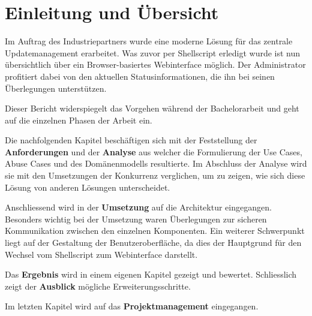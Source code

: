 \begin{comment}
Einführung in die Problem- und Aufgabenstellung. Übersicht über die übrigen Teile der Abgabe.

Diese Einleitung soll für den Ingenieur irgendeiner Fachrichtung verständlich sein. Sie stellt die Aufgabe in einen grösseren Zusammenhang und liefert eine genaue Beschreibung der Problemstellung. Allfällige Vorarbeiten oder ähnlich gelagerte Arbeiten werden diskutiert.
\end{comment}

\chapter{Einleitung und Übersicht}

Im Auftrag des Industriepartners wurde eine moderne Lösung für das zentrale Updatemanagement erarbeitet. Was zuvor per Shellscript erledigt wurde ist nun übersichtlich über ein Browser-basiertes Webinterface möglich. Der Administrator profitiert dabei von den aktuellen Statusinformationen, die ihn bei seinen Überlegungen unterstützen.

Dieser Bericht widerspiegelt das Vorgehen während der Bachelorarbeit und geht auf die einzelnen Phasen der Arbeit ein.

Die nachfolgenden Kapitel beschäftigen sich mit der Feststellung der \textbf{Anforderungen} und der \textbf{Ana\-ly\-se} aus welcher die Formulierung der Use Cases, Abuse Cases und des Domänenmodells resultierte. Im Abschluss der Analyse wird sie mit den Umsetzungen der Konkurrenz verglichen, um zu zeigen, wie sich diese Lösung von anderen Lösungen unterscheidet.

Anschliessend wird in der \textbf{Umsetzung} auf die Architektur eingegangen. Besonders wichtig bei der Umsetzung waren Überlegungen zur sicheren Kommunikation zwischen den einzelnen Komponenten. Ein weiterer Schwerpunkt liegt auf der Gestaltung der Benutzeroberfläche, da dies der Hauptgrund für den Wechsel vom Shellscript zum Webinterface darstellt.

Das \textbf{Ergebnis} wird in einem eigenen Kapitel gezeigt und bewertet. Schliesslich zeigt der \textbf{Ausblick} mögliche Erweiterungsschritte.

Im letzten Kapitel wird auf das \textbf{Projektmanagement} eingegangen.
